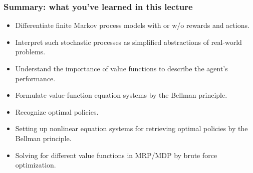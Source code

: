 \begin{frame}
	\frametitle{Summary: what you've learned in this lecture}
	\begin{itemize}
		\item Differentiate finite Markov process models with or w/o rewards and actions.\pause
		\item Interpret such stochastic processes as simplified abstractions of real-world problems.\pause
		\item Understand the importance of value functions to describe the agent's performance. \pause
		\item Formulate value-function equation systems by the Bellman principle.\pause
		\item Recognize optimal policies.\pause
		\item Setting up nonlinear equation systems for retrieving optimal policies by the Bellman principle.\pause
		\item Solving for different value functions in MRP/MDP by brute force optimization.
	\end{itemize}
\end{frame}
